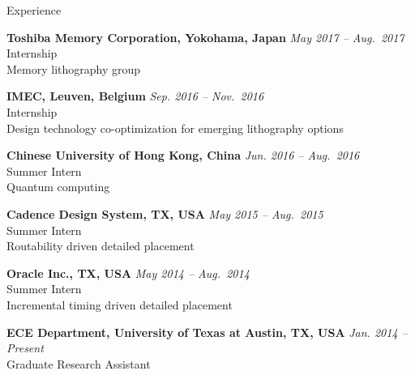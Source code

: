 
\begin{rSection}{Experience}

{\bf Toshiba Memory Corporation, Yokohama, Japan}                           \hfill {\em May 2017 -- Aug.~2017} \\
Internship \\
Memory lithography group

{\bf IMEC, Leuven, Belgium}                           \hfill {\em Sep. 2016 -- Nov.~2016} \\
Internship \\
Design technology co-optimization for emerging lithography options

{\bf Chinese University of Hong Kong, China}                           \hfill {\em Jun. 2016 -- Aug.~2016} \\
Summer Intern \\
Quantum computing

{\bf Cadence Design System, TX, USA}                           \hfill {\em May 2015 -- Aug.~2015} \\
Summer Intern \\
Routability driven detailed placement

{\bf Oracle Inc., TX, USA}                           \hfill {\em May 2014 -- Aug.~2014} \\
Summer Intern \\
Incremental timing driven detailed placement

{\bf ECE Department, University of Texas at Austin, TX, USA}  \hfill {\em Jan. 2014 -- Present} \\
Graduate Research Assistant \\

\end{rSection}


